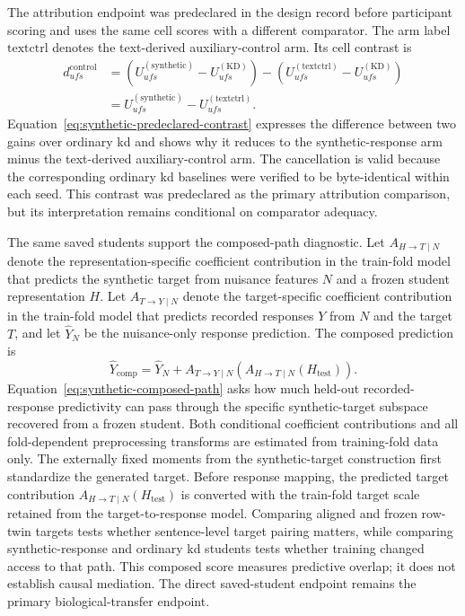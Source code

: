 The attribution endpoint was predeclared in the design record before participant scoring and uses the same cell scores with a different comparator.
The arm label \(\mathrm{textctrl}\) denotes the text-derived auxiliary-control arm.
Its cell contrast is
\begin{equation}
\begin{aligned}
d_{ufs}^{\mathrm{control}}
&=
\left(
U_{ufs}^{(\mathrm{synthetic})}
-
U_{ufs}^{(\mathrm{KD})}
\right)
-
\left(
U_{ufs}^{(\mathrm{textctrl})}
-
U_{ufs}^{(\mathrm{KD})}
\right)
\\
&=
U_{ufs}^{(\mathrm{synthetic})}
-
U_{ufs}^{(\mathrm{textctrl})}.
\end{aligned}
\label{eq:synthetic-predeclared-contrast}
\end{equation}
Equation~\ref{eq:synthetic-predeclared-contrast} expresses the difference between two gains over ordinary \ac{kd} and shows why it reduces to the synthetic-response arm minus the text-derived auxiliary-control arm.
The cancellation is valid because the corresponding ordinary \ac{kd} baselines were verified to be byte-identical within each seed.
This contrast was predeclared as the primary attribution comparison, but its interpretation remains conditional on comparator adequacy.

The same saved students support the composed-path diagnostic.
Let \(A_{H\rightarrow T\mid N}\) denote the representation-specific coefficient contribution in the train-fold model that predicts the synthetic target from nuisance features \(N\) and a frozen student representation \(H\).
Let \(A_{T\rightarrow Y\mid N}\) denote the target-specific coefficient contribution in the train-fold model that predicts recorded responses \(Y\) from \(N\) and the target \(T\), and let \(\widehat{Y}_{N}\) be the nuisance-only response prediction.
The composed prediction is
\begin{equation}
\widehat{Y}_{\mathrm{comp}}
=
\widehat{Y}_{N}
+
A_{T\rightarrow Y\mid N}
\!\left(
A_{H\rightarrow T\mid N}(H_{\mathrm{test}})
\right).
\label{eq:synthetic-composed-path}
\end{equation}
Equation~\ref{eq:synthetic-composed-path} asks how much held-out recorded-response predictivity can pass through the specific synthetic-target subspace recovered from a frozen student.
Both conditional coefficient contributions and all fold-dependent preprocessing transforms are estimated from training-fold data only.
The externally fixed moments from the synthetic-target construction first standardize the generated target.
Before response mapping, the predicted target contribution \(A_{H\rightarrow T\mid N}(H_{\mathrm{test}})\) is converted with the train-fold target scale retained from the target-to-response model.
Comparing aligned and frozen row-twin targets tests whether sentence-level target pairing matters, while comparing synthetic-response and ordinary \ac{kd} students tests whether training changed access to that path.
This composed score measures predictive overlap; it does not establish causal mediation.
The direct saved-student endpoint remains the primary biological-transfer endpoint.

